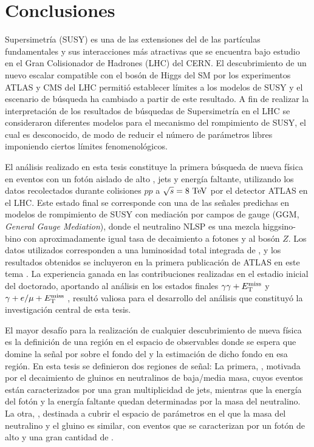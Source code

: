 \chapter{Conclusiones}\label{cap:conclusiones}

Supersimetría (SUSY) es una de las extensiones del {\SM} de las partículas
fundamentales y sus interacciones más atractivas que se encuentra bajo estudio en el
Gran Colisionador de Hadrones (LHC) del CERN. El descubrimiento de un nuevo
escalar compatible con el bosón de Higgs del SM por los experimentos ATLAS
\cite{Aad:2012tfa} y CMS del LHC permitió establecer límites a los modelos de SUSY y el
escenario de búsqueda ha cambiado a partir de este resultado. A fin de realizar
la interpretación de los resultados de búsquedas de Supersimetría en el LHC se
consideraron diferentes modelos para el mecanismo del rompimiento de SUSY, el
cual es desconocido, de modo de reducir el número de parámetros libres
imponiendo ciertos límites fenomenológicos.

El análisis realizado en esta tesis constituye la primera búsqueda de nueva
física en eventos con un fotón aislado de alto {\pt}, jets y energía faltante,
utilizando los datos recolectados durante colisiones $pp$ a $\sqrt{s}=8 \tev$
por el detector ATLAS en el LHC. Este estado final se corresponde con una de las se\~nales
predichas en modelos de rompimiento de SUSY con mediación por campos de gauge (GGM, \emph{General Gauge
  Mediation}), donde el neutralino NLSP es una mezcla higgsino-bino con
aproximadamente igual tasa de decaimiento a fotones y al bosón $Z$. Los datos
utilizados corresponden a una luminosidad total integrada de {\ilumi}, y los
resultados obtenidos se incluyeron en la primera publicación de ATLAS en este
tema \cite{Aad:2015hea}. La experiencia ganada en las contribuciones realizadas
en el estadio inicial del doctorado, aportando al análisis en los estados
finales $\gamma\gamma+E_{\mathrm{T}}^{\mathrm{miss}}$ \cite{Aad2012519,ATLAS-CONF-2014-001} y
$\gamma+e/\mu+E_{\mathrm{T}}^{\mathrm{miss}}$ \cite{ATLAS-CONF-2012-144}, resultó valiosa para el
desarrollo del análisis que constituyó la investigación central de esta tesis.

El mayor desafío para la realización de cualquier descubrimiento de nueva física
es la definición de una región en el espacio de observables donde se espera que
domine la señal por sobre el fondo del {\SM} y la estimación de dicho fondo en
esa región. En esta tesis se definieron dos regiones de señal: La primera,
{\SRL}, motivada por el decaimiento de gluinos en neutralinos de baja/media
masa, cuyos eventos están caracterizados por una gran multiplicidad de jets,
mientras que la energía del fotón y la energía faltante quedan determinadas por
la masa del neutralino. La otra, {\SRH}, destinada a cubrir el espacio de
parámetros en el que la masa del neutralino y el gluino es similar, con eventos que
se caracterizan por un fotón de alto {\pt} y una gran cantidad de {\met}.

